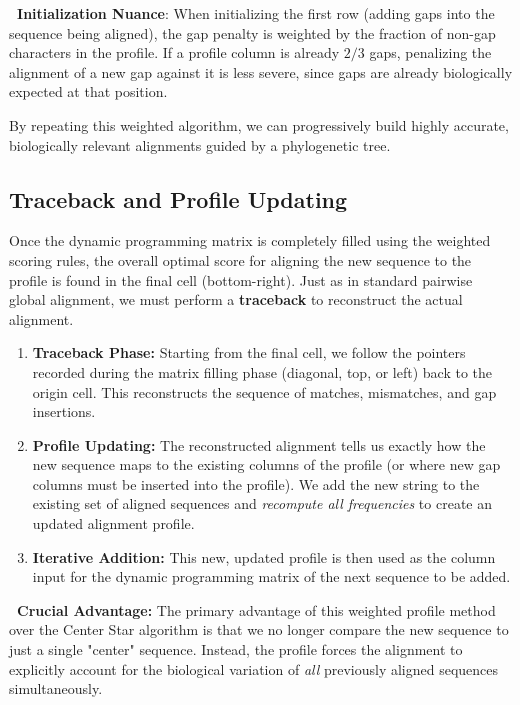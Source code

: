 \documentclass[11pt, a4paper]{article}
\newcommand{\sta}{\textbf{\sffamily [CRITICAL / EXAM]\ }}
\begin{document}
\sta \textbf{Initialization Nuance}: When initializing the first row (adding gaps into the sequence being aligned), the gap penalty is weighted by the fraction of non-gap characters in the profile. If a profile column is already $2/3$ gaps, penalizing the alignment of a new gap against it is less severe, since gaps are already biologically expected at that position.

By repeating this weighted algorithm, we can progressively build highly accurate, biologically relevant alignments guided by a phylogenetic tree.

\subsection{Traceback and Profile Updating}

Once the dynamic programming matrix is completely filled using the weighted scoring rules, the overall optimal score for aligning the new sequence to the profile is found in the final cell (bottom-right). Just as in standard pairwise global alignment, we must perform a \textbf{traceback} to reconstruct the actual alignment.

\begin{enumerate}
    \item \textbf{Traceback Phase:} Starting from the final cell, we follow the pointers recorded during the matrix filling phase (diagonal, top, or left) back to the origin cell. This reconstructs the sequence of matches, mismatches, and gap insertions.
    \item \textbf{Profile Updating:} The reconstructed alignment tells us exactly how the new sequence maps to the existing columns of the profile (or where new gap columns must be inserted into the profile). We add the new string to the existing set of aligned sequences and \textit{recompute all frequencies} to create an updated alignment profile.
    \item \textbf{Iterative Addition:} This new, updated profile is then used as the column input for the dynamic programming matrix of the next sequence to be added.
\end{enumerate}

\sta \textbf{Crucial Advantage:} The primary advantage of this weighted profile method over the Center Star algorithm is that we no longer compare the new sequence to just a single "center" sequence. Instead, the profile forces the alignment to explicitly account for the biological variation of \textit{all} previously aligned sequences simultaneously.
\end{document}
